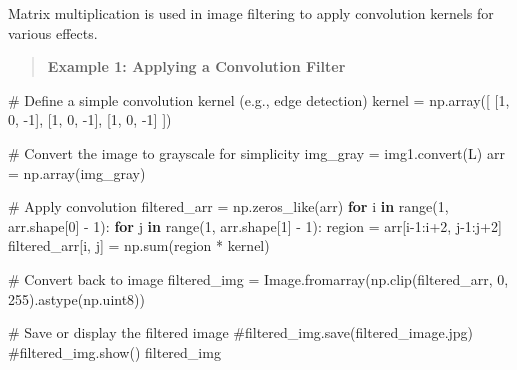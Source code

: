 \documentclass[
  letterpaper,
  DIV=11,
  numbers=noendperiod]{scrreprt}
\newenvironment{Shaded}{\begin{snugshade}}{\end{snugshade}}
\newcommand{\BuiltInTok}[1]{\textcolor[rgb]{0.00,0.23,0.31}{#1}}
\newcommand{\CommentTok}[1]{\textcolor[rgb]{0.37,0.37,0.37}{#1}}
\newcommand{\ControlFlowTok}[1]{\textcolor[rgb]{0.00,0.23,0.31}{\textbf{#1}}}
\newcommand{\DecValTok}[1]{\textcolor[rgb]{0.68,0.00,0.00}{#1}}
\newcommand{\KeywordTok}[1]{\textcolor[rgb]{0.00,0.23,0.31}{\textbf{#1}}}
\newcommand{\NormalTok}[1]{\textcolor[rgb]{0.00,0.23,0.31}{#1}}
\newcommand{\OperatorTok}[1]{\textcolor[rgb]{0.37,0.37,0.37}{#1}}
\newcommand{\StringTok}[1]{\textcolor[rgb]{0.13,0.47,0.30}{#1}}
\theoremstyle{plain}
\theoremstyle{definition}
\theoremstyle{remark}
\begin{document}
Matrix multiplication is used in image filtering to apply convolution
kernels for various effects.

\begin{quote}
\textbf{Example 1: Applying a Convolution Filter}
\end{quote}

\begin{Shaded}
\begin{Highlighting}[]
\CommentTok{\# Define a simple convolution kernel (e.g., edge detection)}
\NormalTok{kernel }\OperatorTok{=}\NormalTok{ np.array([}
\NormalTok{    [}\DecValTok{1}\NormalTok{, }\DecValTok{0}\NormalTok{, }\OperatorTok{{-}}\DecValTok{1}\NormalTok{],}
\NormalTok{    [}\DecValTok{1}\NormalTok{, }\DecValTok{0}\NormalTok{, }\OperatorTok{{-}}\DecValTok{1}\NormalTok{],}
\NormalTok{    [}\DecValTok{1}\NormalTok{, }\DecValTok{0}\NormalTok{, }\OperatorTok{{-}}\DecValTok{1}\NormalTok{]}
\NormalTok{])}

\CommentTok{\# Convert the image to grayscale for simplicity}
\NormalTok{img\_gray }\OperatorTok{=}\NormalTok{ img1.convert(}\StringTok{\textquotesingle{}L\textquotesingle{}}\NormalTok{)}
\NormalTok{arr }\OperatorTok{=}\NormalTok{ np.array(img\_gray)}

\CommentTok{\# Apply convolution}
\NormalTok{filtered\_arr }\OperatorTok{=}\NormalTok{ np.zeros\_like(arr)}
\ControlFlowTok{for}\NormalTok{ i }\KeywordTok{in} \BuiltInTok{range}\NormalTok{(}\DecValTok{1}\NormalTok{, arr.shape[}\DecValTok{0}\NormalTok{] }\OperatorTok{{-}} \DecValTok{1}\NormalTok{):}
    \ControlFlowTok{for}\NormalTok{ j }\KeywordTok{in} \BuiltInTok{range}\NormalTok{(}\DecValTok{1}\NormalTok{, arr.shape[}\DecValTok{1}\NormalTok{] }\OperatorTok{{-}} \DecValTok{1}\NormalTok{):}
\NormalTok{        region }\OperatorTok{=}\NormalTok{ arr[i}\OperatorTok{{-}}\DecValTok{1}\NormalTok{:i}\OperatorTok{+}\DecValTok{2}\NormalTok{, j}\OperatorTok{{-}}\DecValTok{1}\NormalTok{:j}\OperatorTok{+}\DecValTok{2}\NormalTok{]}
\NormalTok{        filtered\_arr[i, j] }\OperatorTok{=}\NormalTok{ np.}\BuiltInTok{sum}\NormalTok{(region }\OperatorTok{*}\NormalTok{ kernel)}

\CommentTok{\# Convert back to image}
\NormalTok{filtered\_img }\OperatorTok{=}\NormalTok{ Image.fromarray(np.clip(filtered\_arr, }\DecValTok{0}\NormalTok{, }\DecValTok{255}\NormalTok{).astype(np.uint8))}

\CommentTok{\# Save or display the filtered image}
\CommentTok{\#filtered\_img.save(\textquotesingle{}filtered\_image.jpg\textquotesingle{})}
\CommentTok{\#filtered\_img.show()}
\NormalTok{filtered\_img}
\end{Highlighting}
\end{Shaded}
\end{document}
